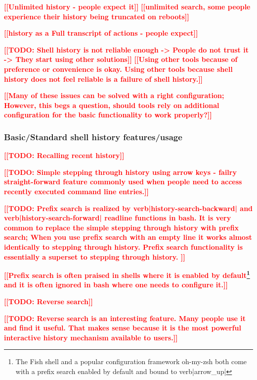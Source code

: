 \documentclass[thesis=M,english]{FITthesis}[2012/10/20]
\newcommand{\todotext}[1]{\textcolor{red}{\textbf{[[#1]]}}}
\begin{document}
\todotext{Unlimited history - people expect it}
\todotext{unlimited search, some people experience their history being truncated on reboots}


\todotext{history as a Full transcript of actions - people expect}


\todotext{TODO: Shell history is not reliable enough -> People do not trust it -> They start using other solutions}
\todotext{Using other tools because of preference or convenience is okay. Using other tools because shell history does not feel reliable is a failure of shell history.}

\todotext{Many of these issues can be solved with a right configuration; However, this begs a question, should tools rely on additional configuration for the basic functionality to work properly?}


\subsubsection*{Basic/Standard shell history features/usage}

\todotext{TODO: Recalling recent history}

\todotext{TODO: Simple stepping through history using arrow keys - failry straight-forward feature commonly used when people need to access recently executed command line entries.}

\todotext{TODO: Prefix search is realized by verb|history-search-backward| and verb|history-search-forward| readline functions in bash. It is very common to replace the simple stepping through history with prefix search; When you use prefix search with an empty line it works almost identically to stepping through history. Prefix search functionality is essentially a superset to stepping through history. }


\todotext{Prefix search is often praised in shells where it is enabled by default\footnote{The Fish shell and a popular configuration framework oh-my-zsh both come with a prefix search enabled by default and bound to verb|arrow\_up|} and it is often ignored in bash where one needs to configure it.}

\todotext{TODO: Reverse search}

\todotext{TODO: Reverse search is an interesting feature. Many people use it and find it useful. That makes sense because it is the most powerful interactive history mechanism available to users.} 
\end{document}
